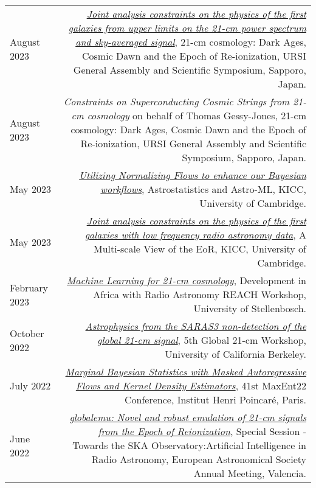 \documentclass{article}
\begin{document}
\begin{tabular}{L!{\vrule}R}
    August 2023 & \href{https://github.com/htjb/Talks/raw/master/Talks/URSI_2023/joint_analysis_margarine.pdf}{\textit{Joint analysis constraints on the physics of the first galaxies from upper limits on the 21-cm power spectrum and sky-averaged signal}}, 21-cm cosmology: Dark Ages, Cosmic Dawn and the Epoch of Re-ionization, URSI General Assembly and Scientific Symposium, Sapporo, Japan. \\
    August 2023 & \textit{Constraints on Superconducting Cosmic Strings from 21-cm cosmology} on behalf of Thomas Gessy-Jones, 21-cm cosmology: Dark Ages, Cosmic Dawn and the Epoch of Re-ionization, URSI General Assembly and Scientific Symposium, Sapporo, Japan. \\
    May 2023 & \href{https://github.com/htjb/Talks/blob/master/Talks/KICC_EoR/Bevins_KICC_EoR.pdf}{\textit{Utilizing Normalizing Flows to enhance our Bayesian workflows}}, Astrostatistics and Astro-ML, KICC, University of Cambridge. \\
    May 2023 & \href{https://github.com/htjb/Talks/blob/master/Talks/KICC_EoR/Bevins_KICC_EoR.pdf}{\textit{Joint analysis constraints on the physics of the first galaxies with low frequency radio astronomy data}}, A Multi-scale View of the EoR, KICC, University of Cambridge. \\
    February 2023 & \href{https://github.com/htjb/Talks/blob/master/Talks/DARA_REACH_Workshop/DARA_Workshop.pdf}{\textit{Machine Learning for 21-cm cosmology}}, Development in Africa with Radio Astronomy REACH Workshop, University of Stellenbosch. \\
    October 2022 & \href{https://global21cmworkshop.org/2022-berkeley/}{\textit{Astrophysics from the SARAS3 non-detection of the global 21-cm signal}}, 5th Global 21-cm Workshop, University of California Berkeley. \\
	July 2022 & \href{https://github.com/htjb/Talks/blob/master/Talks/MaxEnt22_margarine_June_2022/MaxEnt_slides.pdf}{\textit{Marginal Bayesian Statistics with Masked Autoregressive Flows and Kernel Density Estimators}}, 41st MaxEnt22 Conference, Institut Henri Poincar\'e, Paris. \\
	June 2022 & \href{https://github.com/htjb/Talks/blob/master/Talks/ESA_globalemu_July_2022/AUDITORIUM\%203A_SS23a_0940_Bevins.pdf}{\textit{globalemu: Novel and robust emulation of 21-cm signals from the Epoch of Reionization}}, Special Session - Towards the SKA Observatory:Artificial Intelligence in Radio Astronomy, European Astronomical Society Annual Meeting, Valencia. \\
\end{tabular}
\end{document}
